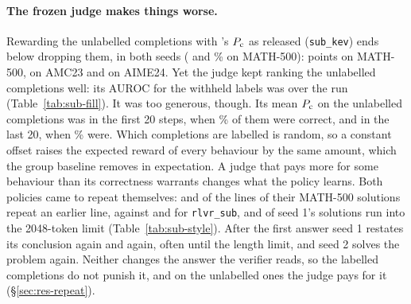 \begin{table}[t]
\centering\small

\caption{Paired differences to \texttt{rlvr\_sub}, in percentage points: per problem, each condition's seed mean,
averaged over problems, with a 95\% bootstrap interval over problems.}
\label{tab:sub-paired}
\end{table}

\paragraph{The frozen judge makes things worse.} Rewarding the unlabelled completions with \kev{}'s $P_{\mathrm{c}}$ as released
(\texttt{sub\_kev}) ends below dropping them, in both seeds ( and \% on
MATH-500):   points on MATH-500, 
 on AMC23 and 
 on AIME24. Yet the judge kept ranking the unlabelled completions
well: its AUROC for the withheld labels was  over the run (Table~\ref{tab:sub-fill}). It was
too generous, though. Its mean $P_{\mathrm{c}}$ on the unlabelled completions was  in the first 20
steps, when \% of them were correct, and  in the last 20, when
\% were. Which completions are labelled is random, so a constant offset raises the expected
reward of every behaviour by the same amount, which the group baseline removes in expectation. A judge that pays more
for some behaviour than its correctness warrants changes what the policy learns. Both policies came to repeat
themselves:  and  of the lines of their MATH-500 solutions repeat an earlier line,
against  and  for \texttt{rlvr\_sub}, and  of seed 1's solutions run into the
2048-token limit (Table~\ref{tab:sub-style}). After the first answer seed 1 restates its conclusion again and again,
often until the length limit, and seed 2 solves the problem again. Neither changes the answer the verifier reads, so the
labelled completions do not punish it, and on the unlabelled ones the judge pays for it (\S\ref{sec:res-repeat}).

\begin{table}[t]
\centering\small

\caption{The fill-in rewards on the unlabelled completions, against the verifier's withheld labels (per step, mean over
steps and seeds): AUROC in the first 20 steps and in each half of the run, the frozen \kev{}'s AUROC on the same
completions, expected calibration error, and the mean fill-in reward against the share that is correct.}
\label{tab:sub-fill}
\end{table}

